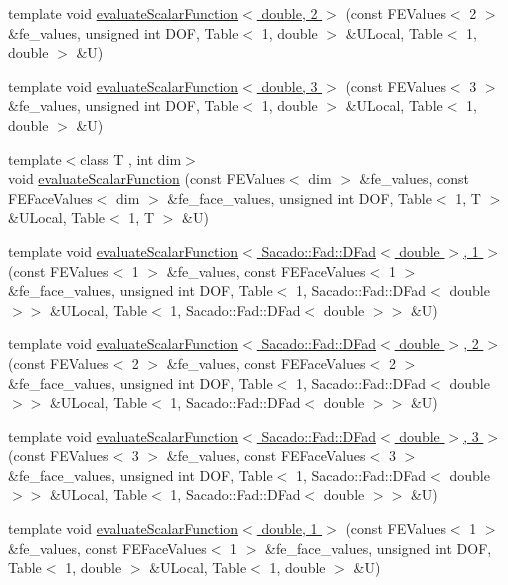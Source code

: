 \begin{DoxyCompactItemize}
\item 
template void \hyperlink{function_evaluations_8cc_a675557db3f31c27e2c45a8bee20dd42a}{evaluate\-Scalar\-Function$<$ double, 2 $>$} (const F\-E\-Values$<$ 2 $>$ \&fe\-\_\-values, unsigned int D\-O\-F, Table$<$ 1, double $>$ \&U\-Local, Table$<$ 1, double $>$ \&U)
\item 
template void \hyperlink{function_evaluations_8cc_acf0861a6c93d4385e4738cd36457969d}{evaluate\-Scalar\-Function$<$ double, 3 $>$} (const F\-E\-Values$<$ 3 $>$ \&fe\-\_\-values, unsigned int D\-O\-F, Table$<$ 1, double $>$ \&U\-Local, Table$<$ 1, double $>$ \&U)
\item 
{\footnotesize template$<$class T , int dim$>$ }\\void \hyperlink{group___evaluation_functions_ga2e2fbeb2173113c6889c73bbb7304789}{evaluate\-Scalar\-Function} (const F\-E\-Values$<$ dim $>$ \&fe\-\_\-values, const F\-E\-Face\-Values$<$ dim $>$ \&fe\-\_\-face\-\_\-values, unsigned int D\-O\-F, Table$<$ 1, T $>$ \&U\-Local, Table$<$ 1, T $>$ \&U)
\item 
template void \hyperlink{function_evaluations_8cc_aba734fcd49b3387c248667715e27f4d8}{evaluate\-Scalar\-Function$<$ Sacado\-::\-Fad\-::\-D\-Fad$<$ double $>$, 1 $>$} (const F\-E\-Values$<$ 1 $>$ \&fe\-\_\-values, const F\-E\-Face\-Values$<$ 1 $>$ \&fe\-\_\-face\-\_\-values, unsigned int D\-O\-F, Table$<$ 1, Sacado\-::\-Fad\-::\-D\-Fad$<$ double $>$$>$ \&U\-Local, Table$<$ 1, Sacado\-::\-Fad\-::\-D\-Fad$<$ double $>$$>$ \&U)
\item 
template void \hyperlink{function_evaluations_8cc_ad678c1a358c17bdfbe0ddebfc9936057}{evaluate\-Scalar\-Function$<$ Sacado\-::\-Fad\-::\-D\-Fad$<$ double $>$, 2 $>$} (const F\-E\-Values$<$ 2 $>$ \&fe\-\_\-values, const F\-E\-Face\-Values$<$ 2 $>$ \&fe\-\_\-face\-\_\-values, unsigned int D\-O\-F, Table$<$ 1, Sacado\-::\-Fad\-::\-D\-Fad$<$ double $>$$>$ \&U\-Local, Table$<$ 1, Sacado\-::\-Fad\-::\-D\-Fad$<$ double $>$$>$ \&U)
\item 
template void \hyperlink{function_evaluations_8cc_aff733718e441e77597fb5f7369b962d7}{evaluate\-Scalar\-Function$<$ Sacado\-::\-Fad\-::\-D\-Fad$<$ double $>$, 3 $>$} (const F\-E\-Values$<$ 3 $>$ \&fe\-\_\-values, const F\-E\-Face\-Values$<$ 3 $>$ \&fe\-\_\-face\-\_\-values, unsigned int D\-O\-F, Table$<$ 1, Sacado\-::\-Fad\-::\-D\-Fad$<$ double $>$$>$ \&U\-Local, Table$<$ 1, Sacado\-::\-Fad\-::\-D\-Fad$<$ double $>$$>$ \&U)
\item 
template void \hyperlink{function_evaluations_8cc_a1b7c8170a7edbde30679da8b7f16d53b}{evaluate\-Scalar\-Function$<$ double, 1 $>$} (const F\-E\-Values$<$ 1 $>$ \&fe\-\_\-values, const F\-E\-Face\-Values$<$ 1 $>$ \&fe\-\_\-face\-\_\-values, unsigned int D\-O\-F, Table$<$ 1, double $>$ \&U\-Local, Table$<$ 1, double $>$ \&U)

\end{DoxyCompactItemize}
